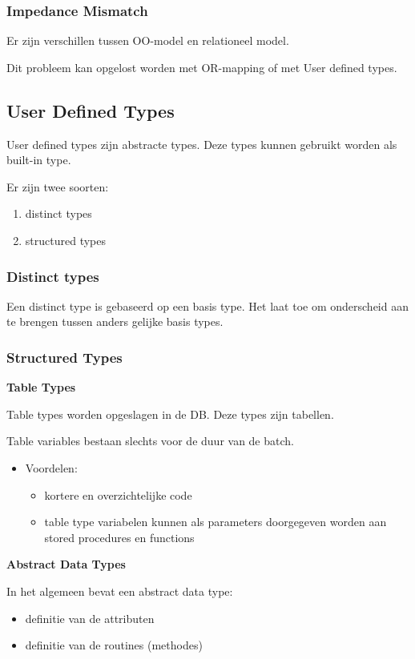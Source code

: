 \documentclass[a4paper,12pt]{article}
\begin{document}
\subsubsection{Impedance Mismatch}
Er zijn verschillen tussen OO-model en relationeel model.

Dit probleem kan opgelost worden met OR-mapping of met User defined types.

\subsection{User Defined Types}
User defined types zijn abstracte types.
Deze types kunnen gebruikt worden als built-in type.

Er zijn twee soorten:
\begin{enumerate}
\item distinct types
\item structured types
\end{enumerate}

\subsubsection{Distinct types}
Een distinct type is gebaseerd op een basis type.
Het laat toe om onderscheid aan te brengen tussen anders gelijke basis types.

\subsubsection{Structured Types}
\textbf{Table Types}

Table types worden opgeslagen in de DB.
Deze types zijn tabellen.

Table variables bestaan slechts voor de duur van de batch.

\begin{itemize}
\item Voordelen:
	\begin{itemize}
	\item kortere en overzichtelijke code
	\item table type variabelen kunnen als parameters doorgegeven worden aan stored procedures en functions
	\end{itemize}
\end{itemize}

\textbf{Abstract Data Types}

In het algemeen bevat een abstract data type:
\begin{itemize}
\item definitie van de attributen
\item definitie van de routines (methodes)
\end{itemize}
\end{document}
